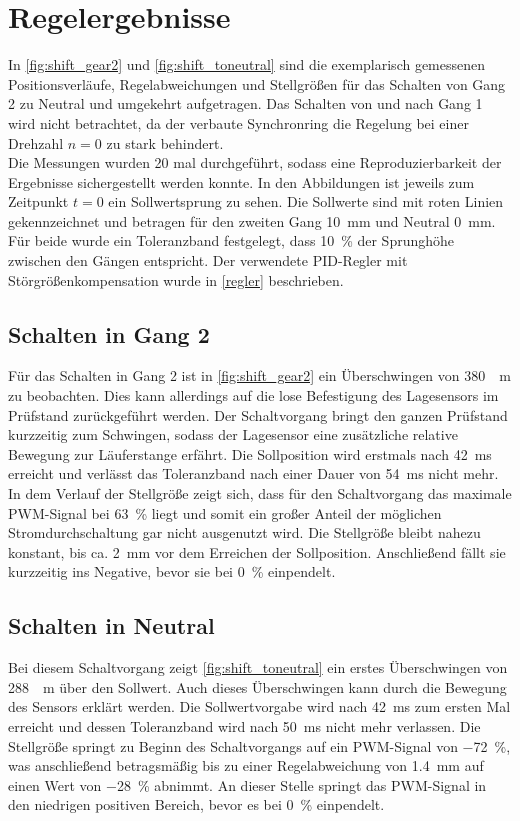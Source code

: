 \section{Regelergebnisse} \label{reglerergebnisse}
In \autoref{fig:shift_gear2} und \autoref{fig:shift_toneutral} sind die exemplarisch gemessenen Positionsverläufe, Regelabweichungen und Stellgrößen für das Schalten von Gang 2 zu Neutral und umgekehrt aufgetragen. Das Schalten von und nach Gang 1 wird nicht betrachtet, da der verbaute Synchronring die Regelung bei einer Drehzahl $n=0$ zu stark behindert.\\
Die Messungen wurden 20 mal durchgeführt, sodass eine Reproduzierbarkeit der Ergebnisse sichergestellt werden konnte. In den Abbildungen ist jeweils zum Zeitpunkt $t=0$ ein Sollwertsprung zu sehen. Die Sollwerte sind mit roten Linien gekennzeichnet und betragen für den zweiten Gang \SI{10}{mm} und Neutral \SI{0}{mm}. Für beide wurde ein Toleranzband festgelegt, dass \SI{10}{\%} der Sprunghöhe zwischen den Gängen entspricht. Der verwendete PID-Regler mit Störgrößenkompensation wurde in \autoref{regler} beschrieben.

\subsection{Schalten in Gang 2}

Für das Schalten in Gang 2 ist in \autoref{fig:shift_gear2} ein Überschwingen von \SI{380}{\mu m} zu beobachten. Dies kann allerdings auf die lose Befestigung des Lagesensors im Prüfstand zurückgeführt werden. Der Schaltvorgang bringt den ganzen Prüfstand kurzzeitig zum Schwingen, sodass der Lagesensor eine zusätzliche relative Bewegung zur Läuferstange erfährt. Die Sollposition wird erstmals nach \SI{42}{ms} erreicht und verlässt das Toleranzband nach einer Dauer von \SI{54}{ms} nicht mehr. In dem Verlauf der Stellgröße zeigt sich, dass für den Schaltvorgang das maximale PWM-Signal bei \SI{63}{\%} liegt und somit ein großer Anteil der möglichen Stromdurchschaltung gar nicht ausgenutzt wird. Die Stellgröße bleibt nahezu konstant, bis ca. \SI{2}{mm} vor dem Erreichen der Sollposition. Anschließend fällt sie kurzzeitig ins Negative, bevor sie bei \SI{0}{\%} einpendelt.  

\subsection{Schalten in Neutral}
Bei diesem Schaltvorgang zeigt \autoref{fig:shift_toneutral} ein erstes Überschwingen von \SI{288}{\mu m} über den Sollwert. Auch dieses Überschwingen kann durch die Bewegung des Sensors erklärt werden. Die Sollwertvorgabe wird nach \SI{42}{ms} zum ersten Mal erreicht und dessen Toleranzband wird nach \SI{50}{ms} nicht mehr verlassen. Die Stellgröße springt zu Beginn des Schaltvorgangs auf ein PWM-Signal von \SI{-72}{\%}, was anschließend betragsmäßig bis zu einer Regelabweichung von \SI{1,4}{mm} auf einen Wert von \SI{-28}{\%} abnimmt. An dieser Stelle springt das PWM-Signal in den niedrigen positiven Bereich, bevor es bei \SI{0}{\%} einpendelt.

